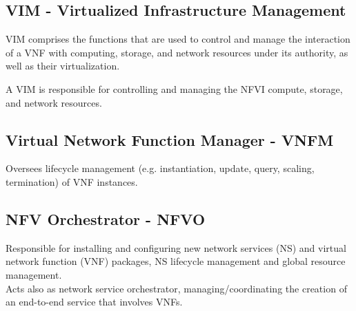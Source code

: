 \subsection*{VIM - Virtualized Infrastructure
Management}
VIM comprises the functions that are used to control and manage the interaction of a VNF with computing, storage, and network resources under its authority, as well as their virtualization.

A VIM is responsible for controlling and managing the NFVI compute, storage, and network resources. 

\subsection*{Virtual Network Function
Manager - VNFM}
Oversees lifecycle management (e.g. instantiation, update, query, scaling, termination) of VNF instances.

\subsection*{NFV Orchestrator - NFVO}
Responsible for installing and configuring new network services (NS) and virtual network function (VNF) packages, NS lifecycle management and global resource management.\\
Acts also as network service orchestrator, managing/coordinating the creation of an end-to-end service that involves VNFs.